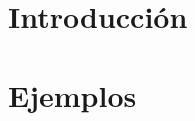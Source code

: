 \documentclass[12pt]{article}
\makeatletter
\newcommand{\tpnumber}{n}       				%
\newcommand{\codigo}{80.00}					%
\newcommand{\materia}{Nombre de la Meteria}	%
\let\thetitle\@title
\let\thedate\@date
\makeatother
\begin{document}



\section{Introducción}

\section{Ejemplos}
\end{document}
